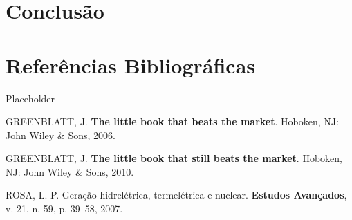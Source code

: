 \documentclass[grad,numbers]{coppe}
\newenvironment{cslreferences}%
  {}%
  {\par}
\begin{document}
  \hypertarget{conclusuxe3o}{%
  \chapter{Conclusão}\label{conclusuxe3o}}

  \hypertarget{referuxeancias-bibliogruxe1ficas}{%
  \chapter*{Referências Bibliográficas}\label{referuxeancias-bibliogruxe1ficas}}

  Placeholder

  \hypertarget{refs}{}
  \begin{cslreferences}
  \leavevmode\hypertarget{ref-greenblatt2006}{}%
  GREENBLATT, J. \textbf{The little book that beats the market}. Hoboken, NJ: John Wiley \& Sons, 2006.

  \leavevmode\hypertarget{ref-greenblatt2010}{}%
  GREENBLATT, J. \textbf{The little book that still beats the market}. Hoboken, NJ: John Wiley \& Sons, 2010.

  \leavevmode\hypertarget{ref-rosa2007}{}%
  ROSA, L. P. Geração hidrelétrica, termelétrica e nuclear. \textbf{Estudos Avançados}, v. 21, n. 59, p. 39--58, 2007.
  \end{cslreferences}
  \backmatter
  
  

\end{document}

